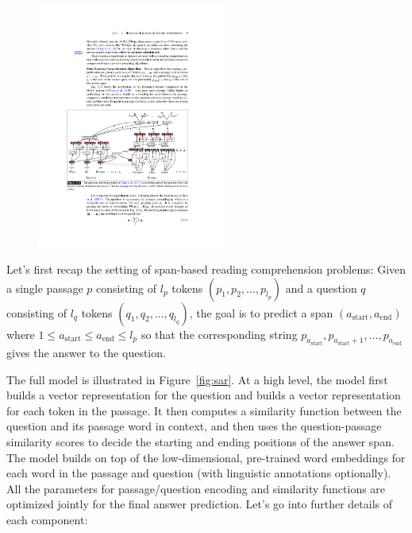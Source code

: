 \begin{figure}[t]
\begin{center}
\includegraphics[height=8cm]{img/drqa_reader.pdf}
\end{center}
\end{figure}

Let's first recap the setting of span-based reading comprehension problems: Given a single passage $p$ consisting of $l_p$ tokens $(p_1, p_2, \ldots, p_{l_p})$ and a question $q$ consisting of $l_q$ tokens $(q_1, q_2, \ldots, q_{l_q})$, the goal is to predict a span $(a_{\text{start}}, a_{\text{end}})$ where $1 \leq a_{\text{start}} \leq a_{\text{end}} \leq l_p$ so that the corresponding string $p_{a_{\text{start}}}, p_{a_{\text{start}} + 1}, \ldots, p_{a_{\text{end}}}$ gives the answer to the question.

The full model is illustrated in Figure~\ref{fig:sar}. At a high level, the model first builds a vector representation for the question and builds a vector representation for each token in the passage. It then computes a similarity function between the question and its passage word in context, and then uses the question-passage similarity scores to decide the starting and ending positions of the answer span. The model builds on top of the low-dimensional, pre-trained word embeddings for each word in the passage and question (with linguistic annotations optionally). All the parameters for passage/question encoding and similarity functions are optimized jointly for the final answer prediction. Let's go into further details of each component:

